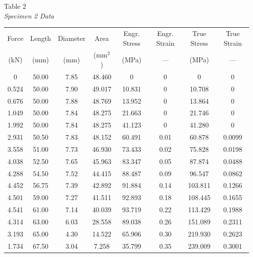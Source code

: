 \documentclass[12pt]{article}
\begin{document}
\begin{center}
Table 2 
\\
\emph{Specimen 2 Data}
\\
\bigskip
\begin{tabular}{ c c c c c c c c }
\hline
Force & Length &  Diameter & Area & Engr. Stress & Engr. Strain & True Stress & True Strain\\
(kN)   & (mm) & (mm) &(mm$^2$)& (MPa)  & ---  & (MPa)   & ---    \\
\hline
0     & 50.00 & 7.85 & 48.460 & 0      & 0    & 0       & 0      \\
0.524 & 50.00 & 7.90 & 49.017 & 10.831 & 0    & 10.708  & 0      \\
0.676 & 50.00 & 7.88 & 48.769 & 13.952 & 0    & 13.864  & 0      \\
1.049 & 50.00 & 7.84 & 48.275 & 21.663 & 0    & 21.746  & 0      \\
1.992 & 50.00 & 7.84 & 48.275 & 41.123 & 0    & 41.280  & 0      \\
2.931 & 50.50 & 7.83 & 48.152 & 60.491 & 0.01 & 60.878  & 0.0099 \\
3.558 & 51.00 & 7.73 & 46.930 & 73.433 & 0.02 & 75.828  & 0.0198 \\
4.038 & 52.50 & 7.65 & 45.963 & 83.347 & 0.05 & 87.874  & 0.0488 \\
4.288 & 54.50 & 7.52 & 44.415 & 88.487 & 0.09 & 96.547  & 0.0862 \\
4.452 & 56.75 & 7.39 & 42.892 & 91.884 & 0.14 & 103.811 & 0.1266 \\
4.501 & 59.00 & 7.27 & 41.511 & 92.893 & 0.18 & 108.445 & 0.1655 \\ 
4.541 & 61.00 & 7.14 & 40.039 & 93.719 & 0.22 & 113.429 & 0.1988 \\
4.314 & 63.00 & 6.03 & 28.558 & 89.038 & 0.26 & 151.089 & 0.2311 \\
3.193 & 65.00 & 4.30 & 14.522 & 65.906 & 0.30 & 219.930 & 0.2623 \\
1.734 & 67.50 & 3.04 & 7.258  & 35.799 & 0.35 & 239.009 & 0.3001 \\
\hline
\end{tabular}
\end{center}

\newpage
\end{document}
